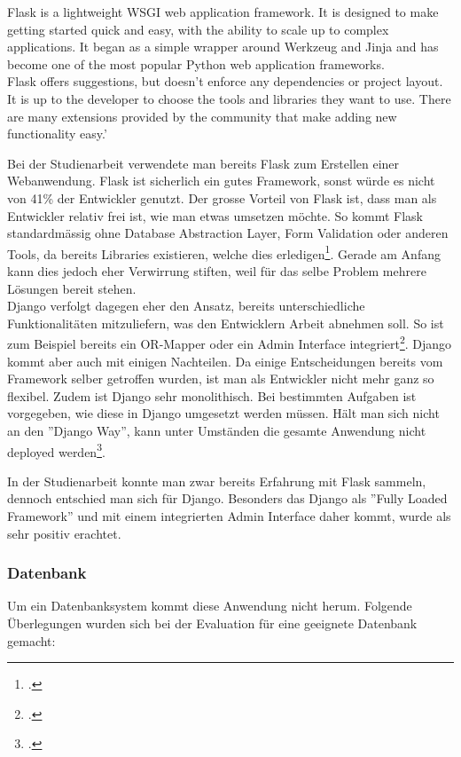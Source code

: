 \begin{displayquote}
Flask is a lightweight WSGI web application framework. It is designed to make getting started quick and easy, with the ability to scale up to complex applications. It began as a simple wrapper around Werkzeug and Jinja and has become one of the most popular Python web application frameworks. \\
Flask offers suggestions, but doesn't enforce any dependencies or project layout. It is up to the developer to choose the tools and libraries they want to use. There are many extensions provided by the community that make adding new functionality easy.'
\end{displayquote}

Bei der Studienarbeit verwendete man bereits Flask zum Erstellen einer Webanwendung. Flask ist sicherlich ein gutes Framework, sonst würde es nicht von 41\% der Entwickler genutzt. Der grosse Vorteil von Flask ist, dass man als Entwickler relativ frei ist, wie man etwas umsetzen möchte. So kommt Flask standardmässig ohne Database Abstraction Layer, Form Validation oder anderen Tools, da bereits Libraries existieren, welche dies erledigen\footcite{flask:design}. Gerade am Anfang kann dies jedoch eher Verwirrung stiften, weil für das selbe Problem mehrere Lösungen bereit stehen. \\

Django verfolgt dagegen eher den Ansatz, bereits unterschiedliche Funktionalitäten mitzuliefern, was den Entwicklern Arbeit abnehmen soll. So ist zum Beispiel bereits ein OR-Mapper oder ein Admin Interface integriert\footcite{django:overview}. 
Django kommt aber auch mit einigen Nachteilen. Da einige Entscheidungen bereits vom Framework selber getroffen wurden, ist man als Entwickler nicht mehr ganz so flexibel. Zudem ist Django sehr monolithisch. Bei bestimmten Aufgaben ist vorgegeben, wie diese in Django umgesetzt werden müssen. Hält man sich nicht an den ''Django Way'', kann unter Umständen die gesamte Anwendung nicht deployed werden\footcite{django:advantages_disadvantages}.

In der Studienarbeit konnte man zwar bereits Erfahrung mit Flask sammeln, dennoch entschied man sich für Django. Besonders das Django als ''Fully Loaded Framework'' und mit einem integrierten Admin Interface daher kommt, wurde als sehr positiv erachtet.


\subsubsection*{Datenbank}
Um ein Datenbanksystem kommt diese Anwendung nicht herum. Folgende Überlegungen wurden sich bei der Evaluation für eine geeignete Datenbank gemacht:

